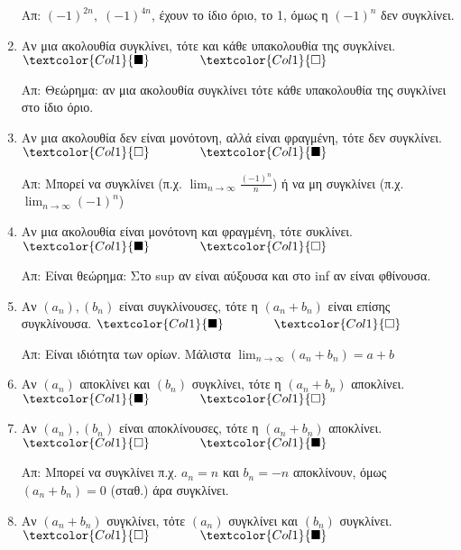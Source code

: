 \documentclass[a4paper,table]{report}
\begin{document}
\begin{enumerate}[itemsep=.5\baselineskip]
    Απ: $ (-1)^{2n}, \; (-1)^{4n} $, έχουν το ίδιο όριο, το 1, όμως η $ (-1)^{n}
    $ δεν συγκλίνει. 

  \item \textcolor{Col1}{Αν μια ακολουθία συγκλίνει, τότε και κάθε υπακολουθία της
    συγκλίνει}.
    \hfill $\textcolor{Col1}{\blacksquare} \qquad \qquad \textcolor{Col1}{\square}$

    Απ: Θεώρημα: αν μια ακολουθία συγκλίνει τότε κάθε υπακολουθία της συγκλίνει 
    στο ίδιο όριο. 

  \item \textcolor{Col1}{Αν μια ακολουθία δεν είναι μονότονη, αλλά είναι φραγμένη, τότε
    δεν συγκλίνει}.
    \hfill $\textcolor{Col1}{\square} \qquad \qquad \textcolor{Col1}{\blacksquare}$

    Απ: Μπορεί να συγκλίνει (π.χ. $ \lim_{n \to \infty} \frac{(-1)^{n}}{n} $) ή 
    να μη συγκλίνει (π.χ. $ \lim_{n \to \infty} (-1)^{n} $)

  \item \textcolor{Col1}{Αν μια ακολουθία είναι μονότονη και φραγμένη, τότε συκλίνει}.
    \hfill $\textcolor{Col1}{\blacksquare} \qquad \qquad \textcolor{Col1}{\square}$

    Απ: Είναι θεώρημα: Στο sup αν είναι αύξουσα και στο inf αν είναι φθίνουσα.

  \item \textcolor{Col1}{Αν $ (a_{n}), (b_{n}) $ είναι συγκλίνουσες, τότε η 
      $(a_{n}+b_{n})$ είναι επίσης συγκλίνουσα}.
    \hfill $\textcolor{Col1}{\blacksquare} \qquad \qquad \textcolor{Col1}{\square}$

    Απ: Είναι ιδιότητα των ορίων. Μάλιστα $ \lim_{n \to \infty} (a_{n}+b_{n}) =a+b $

  \item \textcolor{Col1}{Αν $ (a_{n}) $ αποκλίνει και $ (b_{n}) $ συγκλίνει, τότε η $
    (a_{n}+b_{n}) $ αποκλίνει}.
    \hfill $\textcolor{Col1}{\blacksquare} \qquad \qquad \textcolor{Col1}{\square}$

  \item \textcolor{Col1}{Αν $ (a_{n}), (b_{n}) $ είναι αποκλίνουσες, τότε η
    $(a_{n}+b_{n})$ αποκλίνει}.
    \hfill $\textcolor{Col1}{\square} \qquad \qquad \textcolor{Col1}{\blacksquare}$

    Απ: Μπορεί να συγκλίνει π.χ. $ a_{n}= n $ και $ b_{n}=-n $ αποκλίνουν, 
    όμως $ (a_{n}+b_{n})=0 $ (σταθ.) άρα συγκλίνει.

  \item \textcolor{Col1}{Αν $ (a_{n}+b_{n}) $ συγκλίνει, τότε $ (a_{n}) 
    $ συγκλίνει και $ (b_{n}) $ συγκλίνει}.
    \hfill $\textcolor{Col1}{\square} \qquad \qquad \textcolor{Col1}{\blacksquare}$


\end{enumerate}
\end{document}
